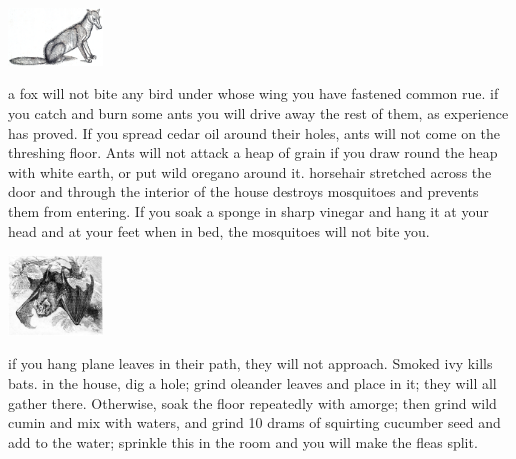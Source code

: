 \begin{center}\includegraphics[width=2.52cm]{encyclopedia/Fox}\end{center}  a fox will not bite any bird under whose wing you have fastened common rue. \localpar
{} if you catch and burn some ants you will drive away the rest of them, as experience has proved. If you spread cedar oil around their holes, ants will not come on the threshing floor. Ants will not attack a heap of grain if you draw round the heap with white earth, or put wild oregano around it. \localpar
{} horsehair stretched across the door and through the interior of the house destroys mosquitoes and prevents them from entering. If you soak a sponge in sharp vinegar and hang it at your head and at your feet when in bed, the mosquitoes will not bite you. \localpar
\begin{center}\includegraphics[width=2.52cm]{encyclopedia/GrosseHufeisennase}\end{center} if you hang plane leaves in their path, they will not approach. Smoked ivy kills bats. \localpar {} in the house, dig a hole; grind oleander leaves and place in it; they will all gather there. Otherwise, soak the floor repeatedly with amorge; then grind wild cumin and mix with waters, and grind 10 drams of squirting cucumber seed and add to the water; sprinkle this in the room and you will make the fleas split. \localpar
